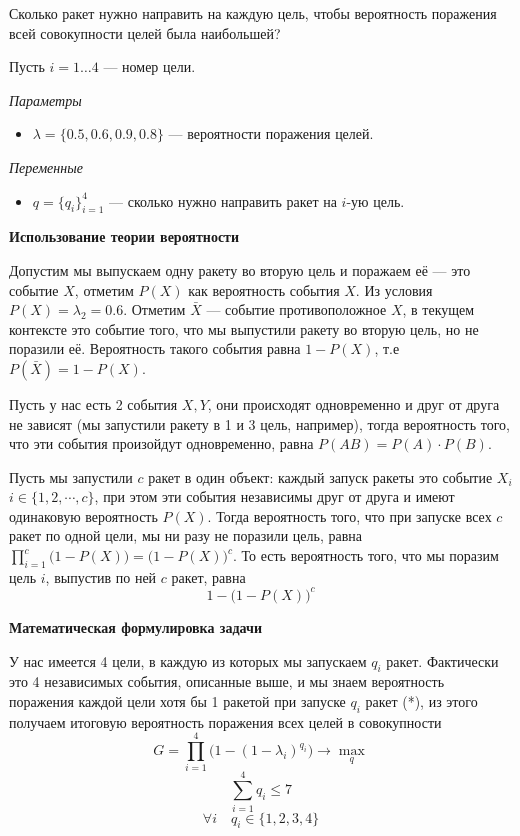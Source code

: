 Сколько ракет нужно направить на каждую цель, чтобы вероятность поражения всей совокупности целей была наибольшей?

\mathmodel

Пусть $i = 1 \dots 4$ --- номер цели.

\bigskip

\textit{Параметры}

\begin{itemize}[nosep]
	\item $\lambda = \{0.5, 0.6, 0.9, 0.8\}$ --- вероятности поражения целей.
\end{itemize}

\bigskip

\textit{Переменные}

\begin{itemize}[nosep]	
	\item $q = \{q_i\}_{i=1}^4$ --- сколько нужно направить ракет на $i$-ую цель.
\end{itemize}

\bigskip

\textbf{Использование теории вероятности}

Допустим мы выпускаем одну ракету во вторую цель и поражаем её --- это событие $X$, отметим $P(X)$ как вероятность события $X$. Из условия $P(X) = \lambda_2 = 0.6$. Отметим $\bar{X}$ --- событие противоположное $X$, в текущем контексте это событие того, что мы выпустили ракету во вторую цель, но не поразили её. Вероятность такого события равна $1 - P(X)$, т.е $P(\bar{X})=1-P(X)$.

Пусть у нас есть 2 события $X, Y$, они происходят одновременно и друг от друга не зависят (мы запустили ракету в 1 и 3 цель, например), тогда вероятность того, что эти события произойдут одновременно, равна $P(AB)=P(A) \cdot P(B)$.

Пусть мы запустили $c$ ракет в один объект: каждый запуск ракеты это событие $X_i$ $i \in \{1, 2, \cdots, c\}$, при этом эти события независимы друг от друга и имеют одинаковую вероятность $P(X)$. Тогда вероятность того, что при запуске всех $c$ ракет по одной цели, мы ни разу не поразили цель, равна $\displaystyle \prod_{i=1}^{c} \big(1 - P(X)\big) = \big(1 - P(X)\big)^c$. То есть вероятность того, что мы поразим цель $i$, выпустив по ней $c$ ракет, равна 
\[1 - \big(1 - P(X)\big)^c \tag{*}\]

\textbf{Математическая формулировка задачи}

У нас имеется 4 цели, в каждую из которых мы запускаем $q_i$ ракет. Фактически это 4 независимых события, описанные выше, и мы знаем вероятность поражения каждой цели хотя бы 1 ракетой при запуске $q_i$ ракет (*), из этого получаем итоговую вероятность поражения всех целей в совокупности
\[G = \displaystyle \prod_{i=1}^{4} \big(1 - (1 - \lambda_i)^{q_i}\big) \to \max_q\]
\[\sum_{i=1}^4 q_i \le 7\]
\[\forall i \quad q_i \in \{1, 2, 3, 4\}\]

